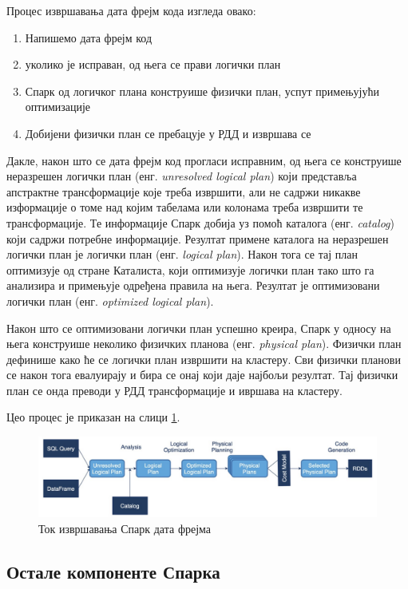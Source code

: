 \documentclass[12pt,oneside]{memoir}
\begin{document}
Процес извршавања дата фрејм кода изгледа овако:
\begin{enumerate}
\item Напишемо дата фрејм код
\item уколико је исправан, од њега се прави логички план
\item Спарк од логичког плана конструише физички план, успут примењујући оптимизације
\item Добијени физички план се пребацује у РДД и извршава се
\end{enumerate}

Дакле, након што се дата фрејм код прогласи исправним, од њега се конструише неразрешен логички план (енг. \textit{unresolved logical plan}) који представља апстрактне трансформације које треба извршити, али не садржи никакве изформације о томе над којим табелама или колонама треба извршити те трансформације. Те информације Спарк добија уз помоћ каталога (енг. \textit{catalog}) који садржи потребне информације. Резултат примене каталога на неразрешен логички план је логички план (енг. \textit{logical plan}). Након тога се тај план оптимизује од стране Каталиста, који оптимизује логички план тако што га анализира и примењује одређена правила на њега. Резултат је оптимизовани логички план (енг. \textit{optimized logical plan}). \cite{spark_guide}

Након што се оптимизовани логички план успешно креира, Спарк у односу на њега конструише неколико физичких планова (енг. \textit{physical plan}). Физички план дефинише како ће се логички план извршити на кластеру. Сви физички планови се након тога евалуирају и бира се онај који даје најбољи резултат. Тај физички план се онда преводи у РДД трансформације и ивршава на кластеру. \cite{spark_guide}

Цео процес је приказан на слици \ref{fig:sprk_ex_plns}.

\begin{figure}[!ht]
  \centering
  \includegraphics[width=1\textwidth]{pictures/spark_logical_plan.jpeg}
  \caption{Ток извршавања Спарк дата фрејма}
  \label{fig:sprk_ex_plns}
\end{figure}


\subsection{Остале компоненте Спарка}
\label{subsec:spark_components}
\end{document}
